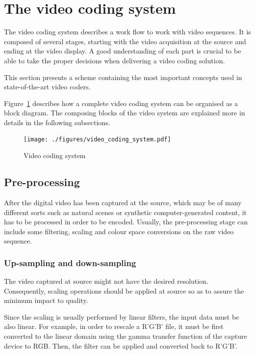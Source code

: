 \documentclass[11pt,a4paper,openright,twoside]{book}
\numberwithin{equation}{section} %
\numberwithin{figure}{section} %
\numberwithin{table}{section} %
\begin{document}
\section{The video coding system}
\label{sec:the_video_coding_system}

The video coding system describes a work flow to work with video
sequences.
It is composed of several stages, starting with the video acquisition at
the source and ending at the video display.
A good understanding of each part is crucial to be able to take the
proper decisions when delivering a video coding solution.

This section presents a scheme containing the most important concepts
used in state-of-the-art video coders.

Figure~\ref{fig:video_coding_system} describes how a complete video coding
system can be organised as a block diagram.
The composing blocks of the video system are explained more in details in the
following subsections.

\begin{figure}[tb]
	\centering
	\texttt{[image: ./figures/video\_coding\_system.pdf]}
	\caption{Video coding system}
	\label{fig:video_coding_system}
\end{figure}

\subsection{Pre-processing}
\label{sub:pre_processing}

After the digital video has been captured at the source, which may be of many
different sorts such as natural scenes or synthetic computer-generated
content, it has to be processed in order to be encoded.
Usually, the pre-processing stage can include some filtering, scaling and
colour space conversions on the raw video sequence.

\subsubsection{Up-sampling and down-sampling}
\label{ssub:up-sampling_and_down-sampling}

The video captured at source might not have the desired resolution.
Consequently, scaling operations should be applied at source so as to assure
the minimum impact to quality.

Since the scaling is usually performed by linear filters, the input data must
be also linear.
For example, in order to rescale a R'G'B' file, it must be first converted to
the linear domain using the gamma transfer function of the capture device to
RGB.
Then, the filter can be applied and converted back to R'G'B'.
\end{document}
